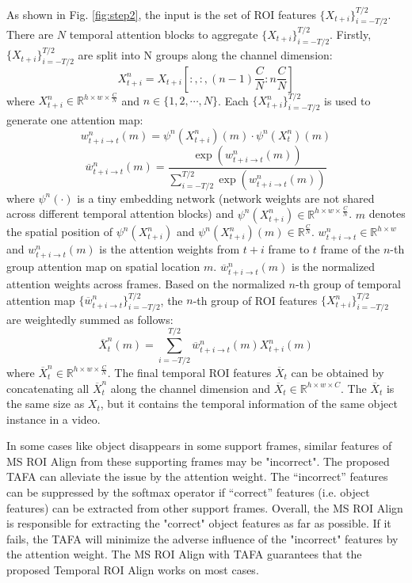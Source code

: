 \documentclass[letterpaper]{article} \usepackage{aaai21}  \usepackage{times}  \usepackage{helvet} \usepackage{courier}  \usepackage[hyphens]{url}  \usepackage{graphicx} \usepackage{hyperref}
\begin{document}
As shown in Fig. \ref{fig:step2}, the input is the set of ROI features $\{X_{t+i}\}_{i=-T/2}^{T/2}$. There are $N$ temporal attention blocks to aggregate $\{X_{t+i}\}_{i=-T/2}^{T/2}$. Firstly, $\{X_{t+i}\}_{i=-T/2}^{T/2}$ are split into N groups along the channel dimension:
\begin{equation}
X^n_{t+i} = X_{t+i}[:,:,(n-1)\frac{C}{N}:n\frac{C}{N}]
\end{equation}
where $X_{t+i}^n\in\mathbb{R}^{h\times w\times \frac{C}{N}}$ and $n\in\{1,2,\cdots, N \}$. Each $\{X_{t+i}^n\}_{i=-T/2}^{T/2}$ is used to generate one attention map:
\begin{equation}
w^n_{t+i\rightarrow t}(m)=\psi^n(X_{t+i}^n)(m)\cdot\psi^n(X_{t}^n)(m)
\end{equation}
\begin{equation}
\overline{w}^n_{t+i\rightarrow t}(m)=\frac{\exp(w^n_{t+i\rightarrow t}(m))}{\textstyle\sum_{i=-T/2}^{T/2}\exp(w^n_{t+i\rightarrow t}(m))}
\end{equation}
where $\psi^n(\cdot)$ is a tiny embedding network (network weights are not shared across different temporal attention blocks) and $\psi^n(X_{t+i}^n)\in\mathbb{R}^{h\times w\times \frac{C}{N}}$. $m$ denotes the spatial position of $\psi^n(X_{t+i}^n)$ and $\psi^n(X_{t+i}^n)(m)\in\mathbb{R}^{\frac{C}{N}}$. $w^n_{t+i\rightarrow t}\in\mathbb{R}^{h\times w}$ and $w^n_{t+i\rightarrow t}(m)$ is the attention weights from $t+i$ frame to $t$ frame of the $n$-th group attention map on spatial location $m$. $\overline{w}^n_{t+i\rightarrow t}(m)$ is the normalized attention weights across frames. Based on the normalized $n$-th group of temporal attention map $\{\overline{w}^n_{t+i\rightarrow t}\}_{i=-T/2}^{T/2}$, the $n$-th group of ROI features $\{X_{t+i}^n\}_{i=-T/2}^{T/2}$ are weightedly summed as follows:
\begin{equation}
\overline{X}^n_t(m)= \textstyle\sum_{i=-T/2}^{T/2}\overline{w}^n_{t+i\rightarrow t}(m)X^n_{t+i}(m)
\end{equation}
where $\overline{X}^n_t\in\mathbb{R}^{h\times w\times \frac{C}{N}}$. The final temporal ROI features $\overline{X}_t$ can be obtained by concatenating all $\overline{X}^n_t$ along the channel dimension and $\overline{X}_t\in\mathbb{R}^{h\times w\times C}$. The $\overline{X}_t$ is the same size as $X_t$, but it contains the temporal information of the same object instance in a video.


In some cases like object disappears in some support frames, similar features of MS ROI Align from these supporting frames may be "incorrect". The proposed TAFA can alleviate the issue by the attention weight. 
The “incorrect” features can be suppressed by the softmax operator if “correct” features (i.e. object features) can be extracted from other support frames. Overall, the MS ROI Align is responsible for extracting the "correct" object features as far as possible. If it fails, the TAFA will minimize the adverse influence of the "incorrect" features by the attention weight. The MS ROI Align with TAFA guarantees that the proposed Temporal ROI Align works on most cases.
\end{document}
